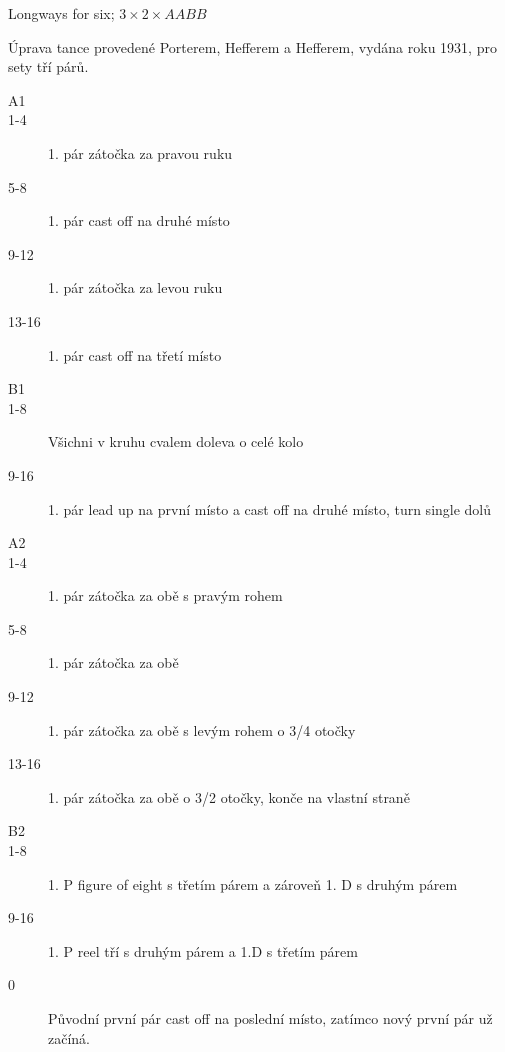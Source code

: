 
{\large Longways for six; $3 \times 2 \times AABB$\hfill {}}

\HRule
\HRule
\vspace{1em}
Úprava tance provedené Porterem, Hefferem a Hefferem, vydána roku 1931, pro sety tří párů.
\begin{description}
    \item[A1]
    \item[1-4]1. pár zátočka za pravou ruku
    \item[5-8]1. pár cast off na druhé místo
    \item[9-12]1. pár zátočka za levou ruku
    \item[13-16]1. pár cast off na třetí místo
    \item[B1]
    \item[1-8] Všichni v kruhu cvalem doleva o celé kolo
    \item[9-16] 1. pár lead up na první místo a cast off na druhé místo, turn single dolů
    \item[A2]
    \item[1-4]1. pár zátočka za obě s pravým rohem
    \item[5-8]1. pár zátočka za obě
    \item[9-12]1. pár zátočka za obě s levým rohem o 3/4 otočky
    \item[13-16]1. pár zátočka za obě o 3/2 otočky, konče na vlastní straně
    \item[B2]
    \item[1-8]1. P figure of eight s třetím párem a zároveň 1. D s druhým párem
    \item[9-16]1. P reel tří s druhým párem a 1.D s třetím párem
    \item[0]Původní první pár cast off na poslední místo, zatímco nový první pár už začíná.
\end{description}